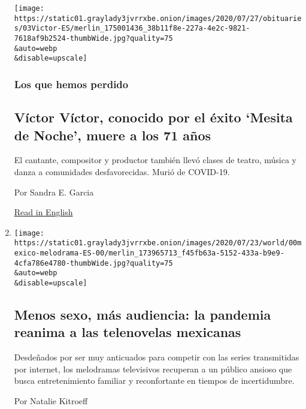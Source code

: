 \begin{enumerate}
  \texttt{[image: https://static01.graylady3jvrrxbe.onion/images/2020/07/27/obituaries/03Victor-ES/merlin\_175001436\_38b11f8e-227a-4e2c-9821-7618af9b2524-thumbWide.jpg?quality=75\\\&auto=webp\\\&disable=upscale]}

  \hypertarget{los-que-hemos-perdido}{%
  \subsubsection{Los que hemos perdido}\label{los-que-hemos-perdido}}

  \hypertarget{vuxedctor-vuxedctor-conocido-por-el-uxe9xito-mesita-de-noche-muere-a-los-71-auxf1os}{%
  \subsection{Víctor Víctor, conocido por el éxito `Mesita de Noche',
  muere a los 71
  años}\label{vuxedctor-vuxedctor-conocido-por-el-uxe9xito-mesita-de-noche-muere-a-los-71-auxf1os}}

  El cantante, compositor y productor también llevó clases de teatro,
  música y danza a comunidades desfavorecidas. Murió de COVID-19.

  Por Sandra E. Garcia

  \href{https://www.nytimes3xbfgragh.onion/2020/08/01/obituaries/victor-victor-dead-coronavirus.html}{Read
  in English}
\item
  \href{/es/2020/08/02/espanol/america-latina/televisa-rosa-de-guadalupe-netflix.html}{}

  \texttt{[image: https://static01.graylady3jvrrxbe.onion/images/2020/07/23/world/00mexico-melodrama-ES-00/merlin\_173965713\_f45fb63a-5152-433a-b9e9-4cfa786e4780-thumbWide.jpg?quality=75\\\&auto=webp\\\&disable=upscale]}

  \hypertarget{menos-sexo-muxe1s-audiencia-la-pandemia-reanima-a-las-telenovelas-mexicanas}{%
  \subsection{Menos sexo, más audiencia: la pandemia reanima a las
  telenovelas
  mexicanas}\label{menos-sexo-muxe1s-audiencia-la-pandemia-reanima-a-las-telenovelas-mexicanas}}

  Desdeñados por ser muy anticuados para competir con las series
  transmitidas por internet, los melodramas televisivos recuperan a un
  público ansioso que busca entretenimiento familiar y reconfortante en
  tiempos de incertidumbre.

  Por Natalie Kitroeff


\end{enumerate}
